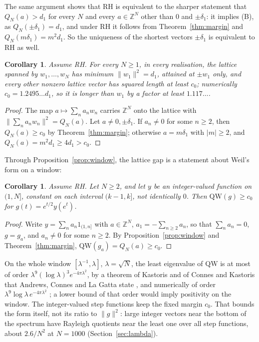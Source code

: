 \documentclass[11pt]{article}
\newtheorem{corollary}[theorem]{Corollary}
\theoremstyle{definition}
\begin{document}
The same argument shows that RH is equivalent to the sharper statement that $Q_N(a) > d_1$ for every $N$ and every
$a \in \mathbb Z^N$ other than $0$ and $\pm\delta_1$: it implies (B), as $Q_N(\pm\delta_1) = d_1$, and under RH it
follows from Theorem~\ref{thm:margin} and $Q_N(m\delta_1) = m^2 d_1$. So the uniqueness of the shortest vectors
$\pm\delta_1$ is equivalent to RH as well.

\begin{corollary}\label{cor:lattice}
Assume RH. For every $N \ge 1$, in every realisation, the lattice spanned by $w_1, \dots, w_N$ has minimum $\|w_1\|^2 =
d_1$, attained at $\pm w_1$ only, and every other nonzero lattice vector has squared length at least $c_0$; numerically
$c_0 = 1.2495\ldots d_1$, so it is longer than $w_1$ by a factor at least $1.117\ldots$.
\end{corollary}

\begin{proof}
The map $a \mapsto \sum_n a_n w_n$ carries $\mathbb Z^N$ onto the lattice with $\|\sum_n a_n w_n\|^2 = Q_N(a)$. Let $a
\ne 0, \pm\delta_1$. If $a_n \ne 0$ for some $n \ge 2$, then $Q_N(a) \ge c_0$ by Theorem~\ref{thm:margin}; otherwise $a
= m\delta_1$ with $|m| \ge 2$, and $Q_N(a) = m^2 d_1 \ge 4d_1 > c_0$.
\end{proof}

Through Proposition~\ref{prop:window}, the lattice gap is a statement about Weil's form on a window:

\begin{corollary}\label{cor:window}
Assume RH. Let $N \ge 2$, and let $y$ be an integer-valued function on $(1, N]$, constant on each interval $(k - 1,
k]$, not identically $0$. Then $\mathrm{QW}(g) \ge c_0$ for $g(t) = e^{t/2} y(e^t)$.
\end{corollary}

\begin{proof}
Write $y = \sum_n a_n 1_{(1, n]}$ with $a \in \mathbb Z^N$, $a_1 = -\sum_{n \ge 2} a_n$, so that $\sum_n a_n = 0$,
$g = g_a$, and $a_n \ne 0$ for some $n \ge 2$. By Proposition~\ref{prop:window} and Theorem~\ref{thm:margin},
$\mathrm{QW}(g_a) = Q_N(a) \ge c_0$.
\end{proof}

On the whole window $[\lambda^{-1}, \lambda]$, $\lambda = \sqrt N$, the least eigenvalue of $\mathrm{QW}$ is at most of
order $\lambda^9 (\log\lambda)^3 e^{-4\pi\lambda^2}$, by a theorem of Kastoris and of Connes and Kastoris that Andrews,
Connes and La Gatta state \cite[Theorem~3.1]{acl26}, and numerically of order $\lambda^9 \log\lambda\,
e^{-4\pi\lambda^2}$ \cite[Section~4]{acl26}; a lower bound of that order would imply positivity on the window. The
integer-valued step functions
keep the fixed margin $c_0$. That bounds the form itself, not its ratio to $\|g\|^2$: large integer vectors near the
bottom of the spectrum have Rayleigh quotients near the least one over all step functions, about $2.6/N^2$ at $N = 1000$
(Section~\ref{sec:lambda}).
\end{document}
